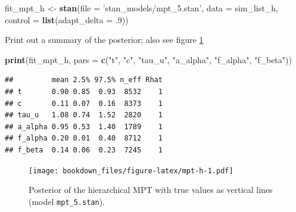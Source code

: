 \documentclass[12pt,]{krantz}
\newenvironment{Shaded}{\begin{snugshade}}{\end{snugshade}}
\newcommand{\DataTypeTok}[1]{\textcolor[rgb]{0.13,0.29,0.53}{#1}}
\newcommand{\FloatTok}[1]{\textcolor[rgb]{0.00,0.00,0.81}{#1}}
\newcommand{\KeywordTok}[1]{\textcolor[rgb]{0.13,0.29,0.53}{\textbf{#1}}}
\newcommand{\NormalTok}[1]{#1}
\newcommand{\OperatorTok}[1]{\textcolor[rgb]{0.81,0.36,0.00}{\textbf{#1}}}
\newcommand{\StringTok}[1]{\textcolor[rgb]{0.31,0.60,0.02}{#1}}
\theoremstyle{definition}
\theoremstyle{definition}
\theoremstyle{definition}
\theoremstyle{remark}
\begin{document}
\begin{Shaded}
\begin{Highlighting}[]
\NormalTok{fit_mpt_h <-}\StringTok{ }\KeywordTok{stan}\NormalTok{(}\DataTypeTok{file =} \StringTok{'stan_models/mpt_5.stan'}\NormalTok{, }
              \DataTypeTok{data =}\NormalTok{ sim_list_h, }
              \DataTypeTok{control =} \KeywordTok{list}\NormalTok{(}\DataTypeTok{adapt_delta =} \FloatTok{.9}\NormalTok{))  }
\end{Highlighting}
\end{Shaded}

Print out a summary of the posterior; also see figure \ref{fig:mpt-h}

\begin{Shaded}
\begin{Highlighting}[]
\KeywordTok{print}\NormalTok{(fit_mpt_h, }\DataTypeTok{pars =} \KeywordTok{c}\NormalTok{(}\StringTok{"t"}\NormalTok{, }\StringTok{"c"}\NormalTok{, }\StringTok{"tau_u"}\NormalTok{, }\StringTok{"a_alpha"}\NormalTok{, }\StringTok{"f_alpha"}\NormalTok{, }\StringTok{"f_beta"}\NormalTok{))}
\end{Highlighting}
\end{Shaded}

\begin{verbatim}
##         mean 2.5% 97.5% n_eff Rhat
## t       0.90 0.85  0.93  8532    1
## c       0.11 0.07  0.16  8373    1
## tau_u   1.08 0.74  1.52  2820    1
## a_alpha 0.95 0.53  1.40  1789    1
## f_alpha 0.20 0.01  0.40  8712    1
## f_beta  0.14 0.06  0.23  7245    1
\end{verbatim}

\begin{Shaded}
\end{Shaded}

\begin{figure}
\centering
\texttt{[image: bookdown\_files/figure-latex/mpt-h-1.pdf]}
\caption{\label{fig:mpt-h}Posterior of the hierarchical MPT with true values as vertical lines (model \texttt{mpt\_5.stan}).}
\end{figure}
\end{document}
